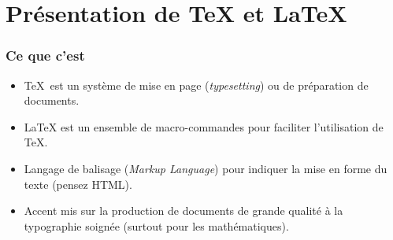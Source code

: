 \section{Présentation de {\TeX} et \LaTeX}


\begin{frame}[c]

	\frametitle{Ce que c'est}
		
			\begin{itemize}
				
				\item \TeX\ est un système de mise en	page (\emph{typesetting}) ou de
				préparation de documents.
				
				\item {\LaTeX} est un ensemble de macro-commandes pour faciliter l’utilisation de \TeX.
				
				\item Langage de balisage (\emph{Markup Language}) pour indiquer la	mise en forme
					du texte (pensez HTML).
					
				\item Accent mis sur la production de documents de grande qualité à la typographie
					soignée (surtout pour les mathématiques).
			\end{itemize}

\end{frame}


